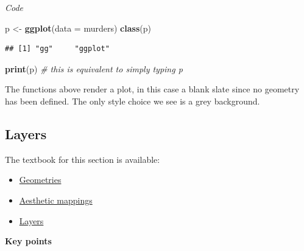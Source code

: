 \documentclass[
]{article}
\newenvironment{Shaded}{\begin{snugshade}}{\end{snugshade}}
\newcommand{\CommentTok}[1]{\textcolor[rgb]{0.56,0.35,0.01}{\textit{#1}}}
\newcommand{\DataTypeTok}[1]{\textcolor[rgb]{0.13,0.29,0.53}{#1}}
\newcommand{\KeywordTok}[1]{\textcolor[rgb]{0.13,0.29,0.53}{\textbf{#1}}}
\newcommand{\NormalTok}[1]{#1}
\newcommand{\OperatorTok}[1]{\textcolor[rgb]{0.81,0.36,0.00}{\textbf{#1}}}
\newcommand{\StringTok}[1]{\textcolor[rgb]{0.31,0.60,0.02}{#1}}
\providecommand{\tightlist}{%
  \setlength{\itemsep}{0pt}\setlength{\parskip}{0pt}}
\begin{document}
\emph{Code}

\begin{Shaded}
\end{Shaded}

\begin{Shaded}
\begin{Highlighting}[]
\NormalTok{p <-}\StringTok{ }\KeywordTok{ggplot}\NormalTok{(}\DataTypeTok{data =}\NormalTok{ murders)}
\KeywordTok{class}\NormalTok{(p)}
\end{Highlighting}
\end{Shaded}

\begin{verbatim}
## [1] "gg"     "ggplot"
\end{verbatim}

\begin{Shaded}
\begin{Highlighting}[]
\KeywordTok{print}\NormalTok{(p)    }\CommentTok{# this is equivalent to simply typing p}
\end{Highlighting}
\end{Shaded}

The functions above render a plot, in this case a blank slate since no
geometry has been defined. The only style choice we see is a grey
background.

\hypertarget{layers}{%
\subsection{Layers}\label{layers}}

The textbook for this section is available:

\begin{itemize}
\tightlist
\item
  \href{https://rafalab.github.io/dsbook/ggplot2.html\#geometries}{Geometries}
\item
  \href{https://rafalab.github.io/dsbook/ggplot2.html\#aesthetic-mappings}{Aesthetic
  mappings}
\item
  \href{https://rafalab.github.io/dsbook/ggplot2.html\#layers}{Layers}
\end{itemize}

\textbf{Key points}
\end{document}
